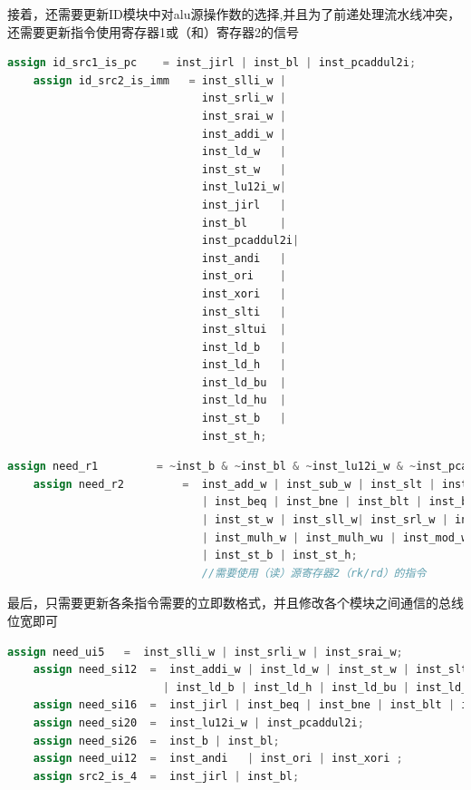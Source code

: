\documentclass[11pt]{article}
\begin{document}
\begin{enumerate}
  接着，还需要更新ID模块中对alu源操作数的选择,并且为了前递处理流水线冲突，还需要更新指令使用寄存器1或（和）寄存器2的信号
  \begin{lstlisting}[language=verilog]
    assign id_src1_is_pc    = inst_jirl | inst_bl | inst_pcaddul2i;
    assign id_src2_is_imm   = inst_slli_w |
                              inst_srli_w |
                              inst_srai_w |
                              inst_addi_w |
                              inst_ld_w   |
                              inst_st_w   |
                              inst_lu12i_w|
                              inst_jirl   |
                              inst_bl     |
                              inst_pcaddul2i|
                              inst_andi   |
                              inst_ori    |
                              inst_xori   |
                              inst_slti   |
                              inst_sltui  |
                              inst_ld_b   |
                              inst_ld_h   |
                              inst_ld_bu  |
                              inst_ld_hu  |
                              inst_st_b   |
                              inst_st_h;
  \end{lstlisting}
  \begin{lstlisting}[language=verilog]
    assign need_r1         = ~inst_b & ~inst_bl & ~inst_lu12i_w & ~inst_pcaddul2i;//需要使用（读）源寄存器1（rj）的指令
    assign need_r2         =  inst_add_w | inst_sub_w | inst_slt | inst_sltu | inst_and | inst_or | inst_nor | inst_xor
                              | inst_beq | inst_bne | inst_blt | inst_bge | inst_bltu | inst_bgeu                           //添加blt等指令
                              | inst_st_w | inst_sll_w| inst_srl_w | inst_sra_w | inst_mul_w 
                              | inst_mulh_w | inst_mulh_wu | inst_mod_w | inst_mod_wu | inst_div_w |inst_div_wu
                              | inst_st_b | inst_st_h;
                              //需要使用（读）源寄存器2（rk/rd）的指令
  \end{lstlisting}

  最后，只需要更新各条指令需要的立即数格式，并且修改各个模块之间通信的总线位宽即可
  \begin{lstlisting}[language=verilog]
    assign need_ui5   =  inst_slli_w | inst_srli_w | inst_srai_w;
    assign need_si12  =  inst_addi_w | inst_ld_w | inst_st_w | inst_slti | inst_sltui 
                        | inst_ld_b | inst_ld_h | inst_ld_bu | inst_ld_hu | inst_st_b | inst_st_h;
    assign need_si16  =  inst_jirl | inst_beq | inst_bne | inst_blt | inst_bge | inst_bltu | inst_bgeu;     //添加blt等指令
    assign need_si20  =  inst_lu12i_w | inst_pcaddul2i;
    assign need_si26  =  inst_b | inst_bl;
    assign need_ui12  =  inst_andi   | inst_ori | inst_xori ;
    assign src2_is_4  =  inst_jirl | inst_bl;    
  \end{lstlisting}


\end{enumerate}
\end{document}
